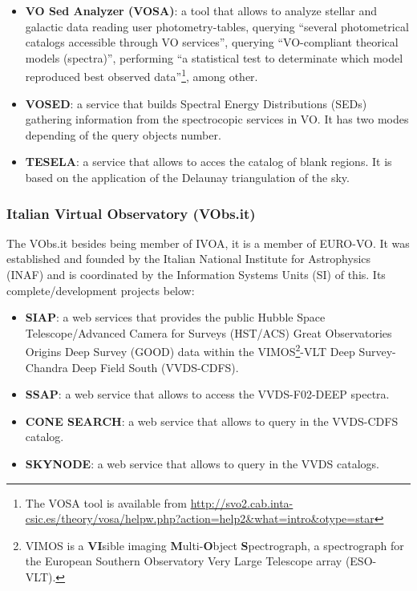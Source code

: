 \begin{itemize}
\item \textbf{VO Sed Analyzer (VOSA)}:
a tool that allows to analyze stellar and galactic data reading user
photometry-tables, querying ``several photometrical catalogs accessible through
VO services'', querying ``VO-compliant theorical models (spectra)'', performing
``a statistical test to determinate which model reproduced best observed
data''\footnote{The VOSA tool is available from
\url{http://svo2.cab.inta-csic.es/theory/vosa/helpw.php?action=help2&what=intro&otype=star}},
among other. 

\item \textbf{VOSED}:
a service that builds Spectral Energy Distributions (SEDs) gathering information
from the spectrocopic services in VO. It has two modes depending of the query
objects number.

\item \textbf{TESELA}:
a service that allows to acces the catalog of blank regions. It is based on the
application of the Delaunay triangulation of the sky.
\end{itemize}

\subsubsection{Italian Virtual Observatory (VObs.it)}
The VObs.it \cite{website:vobs.it-home} besides being member of IVOA, it is a
member of EURO-VO. It was established and founded by the Italian National
Institute for Astrophysics (INAF) and is coordinated by the Information Systems
Units (SI) of this. Its complete/development projects below:

\begin{itemize}
\item \textbf{SIAP}:
a web services that provides the public Hubble Space Telescope/Advanced Camera
for Surveys (HST/ACS) Great Observatories Origins Deep Survey (GOOD) data within
the VIMOS\footnote{VIMOS is a \textbf{VI}sible imaging
\textbf{M}ulti-\textbf{O}bject \textbf{S}pectrograph, a spectrograph for the
European Southern Observatory Very Large Telescope array (ESO-VLT).}-VLT Deep
Survey-Chandra Deep Field South (VVDS-CDFS).

\item \textbf{SSAP}:
a web service that allows to access the VVDS-F02-DEEP spectra.

\item \textbf{CONE SEARCH}:
a web service that allows to query in the VVDS-CDFS catalog. 

\item \textbf{SKYNODE}:
a web service that allows to query in the VVDS catalogs. 
\end{itemize}

